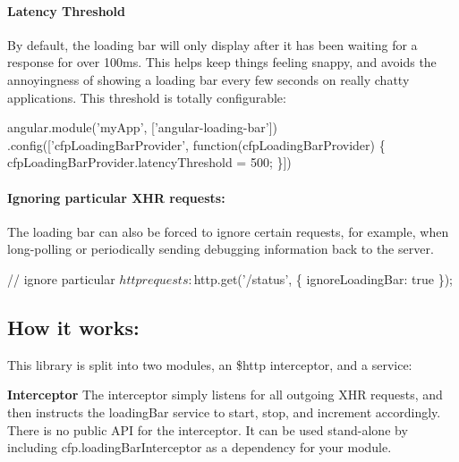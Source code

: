 \paragraph*{Latency Threshold}

By default, the loading bar will only display after it has been waiting for a response for over 100ms. This helps keep things feeling snappy, and avoids the annoyingness of showing a loading bar every few seconds on really chatty applications. This threshold is totally configurable\+:


\begin{DoxyCode}
angular.module('myApp', ['angular-loading-bar'])
  .config(['cfpLoadingBarProvider', function(cfpLoadingBarProvider) \{
    cfpLoadingBarProvider.latencyThreshold = 500;
  \}])
\end{DoxyCode}


\paragraph*{Ignoring particular X\+HR requests\+:}

The loading bar can also be forced to ignore certain requests, for example, when long-\/polling or periodically sending debugging information back to the server.


\begin{DoxyCode}
// ignore particular $http requests:
$http.get('/status', \{
  ignoreLoadingBar: true
\});
\end{DoxyCode}





\subsection*{How it works\+:}

This library is split into two modules, an \$http {\ttfamily interceptor}, and a {\ttfamily service}\+:

{\bfseries Interceptor} The interceptor simply listens for all outgoing X\+HR requests, and then instructs the loading\+Bar service to start, stop, and increment accordingly. There is no public A\+PI for the interceptor. It can be used stand-\/alone by including {\ttfamily cfp.\+loading\+Bar\+Interceptor} as a dependency for your module.

